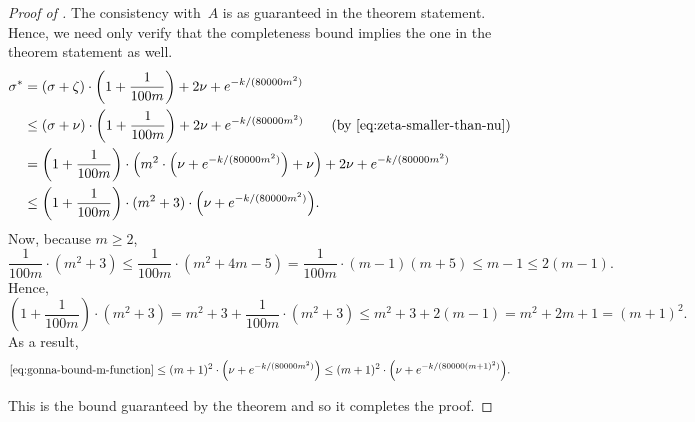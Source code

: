 \begin{proof}[Proof of ]
The consistency with~$A$ is as guaranteed in the theorem statement.
Hence, we need only verify that the completeness bound implies the one in the theorem statement as well.
\begin{align}
\sigma^*
&= (\sigma + \zeta) \cdot \left(1 + \frac{1}{100m}\right)
						    + 2\nu + e^{- k/(80000m^2)}\nonumber\\
&\leq  (\sigma + \nu) \cdot \left(1 + \frac{1}{100m}\right)
						    + 2\nu + e^{- k/(80000m^2)} \tag{by \Cref{eq:zeta-smaller-than-nu}}\nonumber\\
& = \left(1 + \frac{1}{100m}\right) \cdot \left(m^2 \cdot\Big(\nu + e^{- k/(80000m^2)}\Big) + \nu\right)
		+ 2\nu + e^{- k/(80000m^2)}\nonumber\\
&\leq \left(1 + \frac{1}{100m}\right) \cdot (m^2+3) \cdot\Big(\nu + e^{- k/(80000m^2)}\Big).\label{eq:gonna-bound-m-function}
\end{align}
Now, because $m \geq 2$,
\begin{equation*}
\frac{1}{100m} \cdot
(m^2+3)
\leq
\frac{1}{100m}\cdot
(m^2+4m-5)
= 
\frac{1}{100m}\cdot
(m-1) (m+5)
\leq m-1
\leq 2(m-1).
\end{equation*}
Hence,
\begin{equation*}
\left(1 + \frac{1}{100m}\right) \cdot (m^2+3)
= m^2 + 3 + \frac{1}{100m} \cdot
(m^2+3)
\leq m^2 + 3 + 2(m-1)
= m^2 + 2m  + 1
= (m+1)^2.
\end{equation*}
As a result,
\begin{equation*}
\eqref{eq:gonna-bound-m-function}
\leq (m+1)^2\cdot\Big(\nu + e^{- k/(80000m^2)}\Big)
\leq (m+1)^2\cdot\Big(\nu + e^{- k/(80000(m+1)^2)}\Big).
\end{equation*}

This is the bound guaranteed by the theorem and so it completes the proof.
\end{proof}

